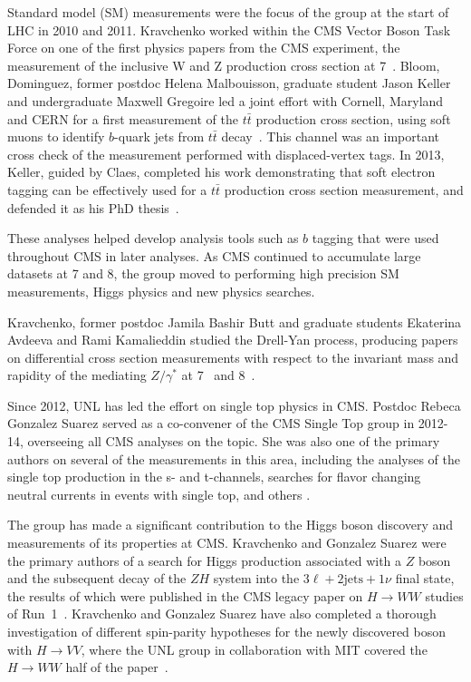 %
%
Standard model (SM) measurements were the focus of the group at the start of LHC in 2010 and 2011. Kravchenko worked within the CMS Vector Boson Task Force on one of the first physics papers from the CMS experiment, the measurement of the inclusive W and Z production cross section at 7\TeV~\cite{bib:firstWandZxsec}. Bloom, Dominguez, former postdoc Helena Malbouisson, graduate student Jason Keller and undergraduate Maxwell Gregoire led a joint effort with Cornell, Maryland and CERN for a first measurement of the $t\bar t$ production cross section, using soft muons to identify $b$-quark jets from $t\bar t$ decay~\cite{bib:smtxsec}. This channel was an important cross check of the measurement performed with displaced-vertex tags. In 2013, Keller, guided by Claes, completed his work demonstrating that soft electron tagging can be effectively used for a $t\bar t$ production cross section measurement, and defended it as his PhD thesis~\cite{bib:Keller-thesis}. 

These analyses helped develop analysis tools such as $b$ tagging that were used throughout CMS in later analyses.  As CMS continued to accumulate large datasets at 7 and 8\TeV, the group moved to performing high precision SM measurements, Higgs physics and new physics searches.

%
%

Kravchenko, former postdoc Jamila Bashir Butt and graduate students Ekaterina Avdeeva and Rami Kamalieddin studied the Drell-Yan process, producing papers on differential cross section measurements with respect to the invariant mass and rapidity of the mediating $Z/\gamma^*$ at 7\TeV~\cite{bib:DY7TeV} and 8\TeV~\cite{bib:DY8TeV}. 

Since 2012, UNL has led the effort on single top physics in CMS. Postdoc Rebeca Gonzalez Suarez served as a co-convener of the CMS Single Top group in 2012-14, overseeing all CMS analyses on the topic. She was also one of the primary authors on several of the measurements in this area, including the analyses of the single top production in the s- and t-channels, searches for flavor changing neutral currents in events with single top, and others \cite{bib:single-top-papers}.

%
%

The group has made a significant contribution to the Higgs boson discovery and measurements of its properties at CMS. Kravchenko and Gonzalez Suarez were the primary authors of a search for Higgs production associated with a $Z$ boson and the subsequent decay of the $ZH$ system into the $3\ell+2\text{jets}+1\nu$ final state, the results of which were published in the CMS legacy paper on $H\rightarrow WW$ studies of Run~1~\cite{bib:HWWlegacy}. Kravchenko and Gonzalez Suarez have also completed a thorough investigation of different spin-parity hypotheses for the newly discovered boson with $H\rightarrow VV$, where the UNL group in collaboration with MIT covered the $H\rightarrow WW$ half of the paper~\cite{bib:higgs-spin-parity}.

